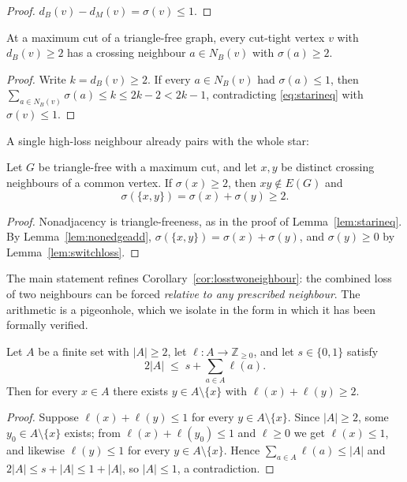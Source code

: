 \begin{proof}
\(d_B(v)-d_M(v)=\sigma(v)\le1\).
\end{proof}

\begin{corollary}\label{cor:losstwoneighbour}
At a maximum cut of a triangle-free graph, every cut-tight vertex \(v\)
with \(d_B(v)\ge2\) has a crossing neighbour \(a\in N_B(v)\) with
\(\sigma(a)\ge2\).
\end{corollary}

\begin{proof}
Write \(k=d_B(v)\ge2\). If every \(a\in N_B(v)\) had \(\sigma(a)\le1\),
then \(\sum_{a\in N_B(v)}\sigma(a)\le k\le2k-2<2k-1\), contradicting
\eqref{eq:starineq} with \(\sigma(v)\le1\).
\end{proof}

A single high-loss neighbour already pairs with the whole star:

\begin{proposition}\label{prop:pairthreshold}
Let \(G\) be triangle-free with a maximum cut, and let \(x,y\) be
distinct crossing neighbours of a common vertex. If \(\sigma(x)\ge2\),
then \(xy\notin E(G)\) and
\[
 \sigma(\{x,y\})=\sigma(x)+\sigma(y)\ge2.
\]
\end{proposition}

\begin{proof}
Nonadjacency is triangle-freeness, as in the proof of
Lemma~\ref{lem:starineq}. By Lemma~\ref{lem:nonedgeadd},
\(\sigma(\{x,y\})=\sigma(x)+\sigma(y)\), and \(\sigma(y)\ge0\) by
Lemma~\ref{lem:switchloss}.
\end{proof}

The main statement refines Corollary~\ref{cor:losstwoneighbour}: the
combined loss of two neighbours can be forced \emph{relative to any
prescribed neighbour}. The arithmetic is a pigeonhole, which we isolate
in the form in which it has been formally verified.

\begin{lemma}\label{lem:starpigeon}
Let \(A\) be a finite set with \(|A|\ge2\), let
\(\ell\colon A\to\mathbb Z_{\ge0}\), and let \(s\in\{0,1\}\) satisfy
\[
 2|A|\;\le\;s+\sum_{a\in A}\ell(a).
\]
Then for every \(x\in A\) there exists \(y\in A\setminus\{x\}\) with
\(\ell(x)+\ell(y)\ge2\).
\end{lemma}

\begin{proof}
Suppose \(\ell(x)+\ell(y)\le1\) for every \(y\in A\setminus\{x\}\).
Since \(|A|\ge2\), some \(y_0\in A\setminus\{x\}\) exists; from
\(\ell(x)+\ell(y_0)\le1\) and \(\ell\ge0\) we get \(\ell(x)\le1\), and
likewise \(\ell(y)\le1\) for every \(y\in A\setminus\{x\}\). Hence
\(\sum_{a\in A}\ell(a)\le|A|\) and
\(2|A|\le s+|A|\le1+|A|\), so \(|A|\le1\), a contradiction.
\end{proof}

